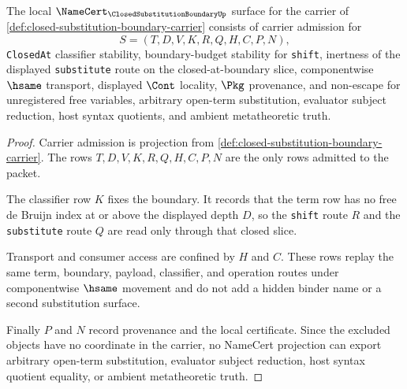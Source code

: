 \begin{theorem}
\label{thm:closed-substitution-boundary-namecert-obligations}
The local $\NameCert_{\ClosedSubstitutionBoundaryUp}$ surface for the carrier of \autoref{def:closed-substitution-boundary-carrier} consists of carrier admission for
$$
S=(T,D,V,K,R,Q,H,C,P,N),
$$
\texttt{ClosedAt} classifier stability, boundary-budget stability for \texttt{shift}, inertness of the displayed \texttt{substitute} route on the closed-at-boundary slice, componentwise $\hsame$ transport, displayed $\Cont$ locality, $\Pkg$ provenance, and non-escape for unregistered free variables, arbitrary open-term substitution, evaluator subject reduction, host syntax quotients, and ambient metatheoretic truth.
\end{theorem}
\begin{proof}
Carrier admission is projection from \autoref{def:closed-substitution-boundary-carrier}. The rows $T,D,V,K,R,Q,H,C,P,N$ are the only rows admitted to the packet.

The classifier row $K$ fixes the boundary. It records that the term row has no free de Bruijn index at or above the displayed depth $D$, so the \texttt{shift} route $R$ and the \texttt{substitute} route $Q$ are read only through that closed slice.

Transport and consumer access are confined by $H$ and $C$. These rows replay the same term, boundary, payload, classifier, and operation routes under componentwise $\hsame$ movement and do not add a hidden binder name or a second substitution surface.

Finally $P$ and $N$ record provenance and the local certificate. Since the excluded objects have no coordinate in the carrier, no NameCert projection can export arbitrary open-term substitution, evaluator subject reduction, host syntax quotient equality, or ambient metatheoretic truth.
\end{proof}

